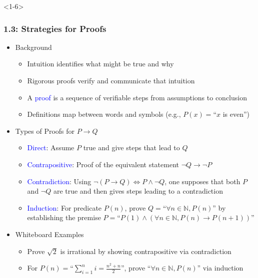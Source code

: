 \documentclass[10pt,english,aspectratio=169]{beamer}
\begin{document}
\begin{frame}<1-6> \frametitle{1.3: Strategies for Proofs}

\begin{itemize}
\setlength\itemsep{2.5mm}
\item<1-> Background \vspace{1mm}
\begin{itemize} 
 \setlength\itemsep{1.25mm}
 \item Intuition identifies what might be true and why
 \item Rigorous proofs verify and communicate that intuition
 \item A \textcolor{blue}{proof} is a sequence of verifiable steps from assumptions to conclusion
 \item Definitions map between words and symbols (e.g., $P(x)=$``$x$ is even'') 
\end{itemize}

\item<2-> Types of Proofs for $P \rightarrow Q$  \vspace{1mm}
\begin{itemize} 
 \setlength\itemsep{1.25mm}
 \item<2-> \textcolor{blue}{Direct}: Assume $P$ true and give steps that lead to $Q$
 \item<3-> \textcolor{blue}{Contrapositive}: Proof of the equivalent statement $\neg Q \rightarrow \neg P$
 \item<4-> \textcolor{blue}{Contradiction}: Using $\neg (P \rightarrow Q) \Leftrightarrow P \wedge \neg Q$, one supposes that both $P$ and $\neg Q$ are true and then gives steps leading to a contradiction
 \item<5-> \textcolor{blue}{Induction}: For predicate $P(n)$, prove $Q=$``$\forall n\in\mathbb{N}, P(n)$'' by establishing the premise $P=$``$P(1) \wedge (\forall n\in \mathbb{N}, P(n) \rightarrow P(n\!+\!1))$''
\end{itemize}

\item<6-> Whiteboard Examples \vspace{1mm}
\begin{itemize} 
 \setlength\itemsep{1.25mm}
 \item Prove $\sqrt{2}$ is irrational by showing contrapositive via contradiction
 \item For $P(n)=$``$\sum_{i=1}^n i = \frac{n^2 + n}{2}$'', prove ``$\forall n\in \mathbb{N}, P(n)$'' via induction
\end{itemize}
\end{itemize}


\end{frame}
\end{document}
